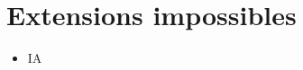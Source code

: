 \documentclass{article}
\begin{document}
\section{Extensions impossibles}
\begin{itemize}
    \item IA
\end{itemize}
\end{document}
